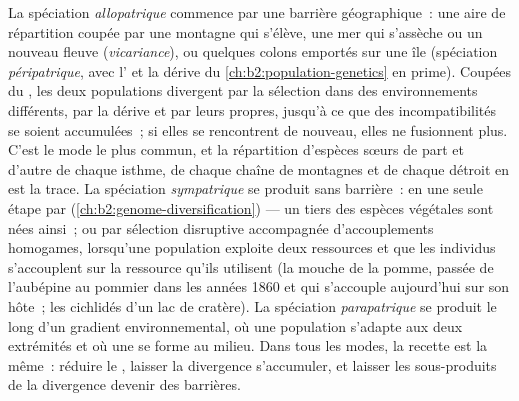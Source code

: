 \begin{proposition}\label{prop:b2:speciation:modes}
La spéciation \emph{allopatrique} commence par une barrière
géographique~: une aire de répartition coupée par une montagne qui
s'élève, une mer qui s'assèche ou un nouveau fleuve
(\emph{vicariance}), ou quelques colons emportés sur une île
(spéciation \emph{péripatrique}, avec l' et la dérive du
\cref{ch:b2:population-genetics} en prime). Coupées du ,
les deux populations divergent par la sélection dans des environnements
différents, par la dérive et par leurs  propres, jusqu'à ce que
des incompatibilités se soient accumulées~; si elles se rencontrent de
nouveau, elles ne fusionnent plus. C'est le mode le plus commun, et la
répartition d'espèces sœurs de part et d'autre de chaque isthme, de
chaque chaîne de montagnes et de chaque détroit en est la trace.
La spéciation \emph{sympatrique} se produit sans barrière~: en une seule
étape par  (\cref{ch:b2:genome-diversification}) --- un tiers
des espèces végétales sont nées ainsi~; ou par sélection disruptive
accompagnée d'accouplements homogames, lorsqu'une population exploite
deux ressources et que les individus s'accouplent sur la ressource qu'ils
utilisent (la mouche de la pomme, passée de l'aubépine au pommier dans
les années 1860 et qui s'accouple aujourd'hui sur son hôte~; les cichlidés
d'un lac de cratère). La spéciation \emph{parapatrique} se produit le long
d'un gradient environnemental, où une population s'adapte aux deux
extrémités et où une  se forme au milieu. Dans tous les
modes, la recette est la même~: réduire le , laisser la
divergence s'accumuler, et laisser les sous-produits de la divergence
devenir des barrières.
\end{proposition}

